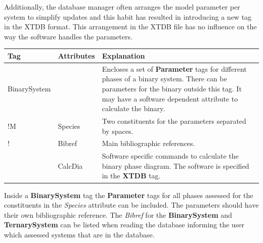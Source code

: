 \documentclass{article}
\begin{document}
Additionally, the database manager often arranges the model parameter
per system to simplify updates and this habit has resulted in
introducing a new tag in the XTDB format.  This arrangement in the
XTDB file has no influence on the way the software handles the
parameters.

\bigskip
\begin{tabular}{|p{} p{} p{}|}\hline
  Tag & Attributes &  Explanation\\\hline

  BinarySystem  && Encloses a set of {\bf Parameter} tags for different
          phases of a binary system.
          There can be parameters for the binary outside this tag.  It may
          have a software dependent attribute to calculate the binary.\\
!M          & Species & Two constituents for the parameters 
                       separated by spaces.  \\
!          & Bibref & Main bibliographic references.\\
          & CalcDia & Software specific commands to calculate the binary
                       phase diagram.  The software is specified in the
                       {\bf XTDB} tag.\\\hline

\end{tabular}

\bigskip
Inside a {\bf BinarySystem} tag the {\bf Parameter} tags for all
phases assessed for the constituents in the {\em Species} attribute
can be included.  The parameters should have their own bibliographic
reference.  The {\em Bibref} for the {\bf BinarySystem} and {\bf
  TernarySystem} can be listed when reading the database informing the
user which assessed systems that are in the database.
\end{document}
